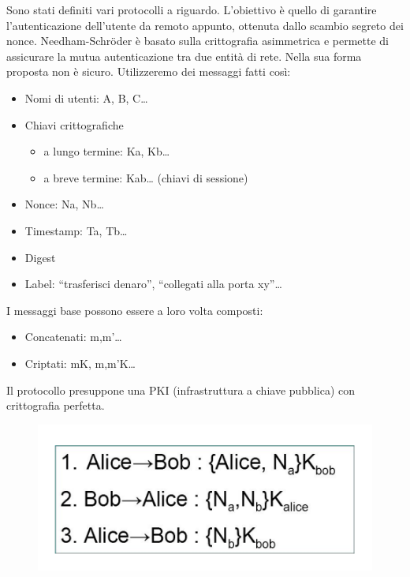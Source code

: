 Sono stati definiti vari protocolli a riguardo. L’obiettivo è quello di
garantire l’autenticazione
dell’utente da remoto appunto, ottenuta dallo scambio segreto dei nonce.
Needham-Schröder è basato sulla crittografia asimmetrica e permette
di assicurare la mutua
autenticazione tra due entità di rete. Nella sua forma proposta
non è sicuro.
Utilizzeremo dei messaggi fatti così:

\begin{itemize}
    \item Nomi di utenti: A, B, C…
    \item Chiavi crittografiche
          \begin{itemize}
              \item a lungo termine: Ka, Kb…
              \item a breve termine: Kab… (chiavi di sessione)
          \end{itemize}
    \item Nonce: Na, Nb…
    \item Timestamp: Ta, Tb…
    \item Digest
    \item Label: “trasferisci denaro”, “collegati alla porta xy”…
\end{itemize}

I messaggi base possono essere a loro volta composti:
\begin{itemize}
    \item Concatenati: m,m’…
    \item Criptati: mK, {m,m’}K…
\end{itemize}

Il protocollo presuppone una PKI (infrastruttura a chiave pubblica)
con crittografia perfetta.

\begin{figure}[H]
    \centering
    \includegraphics[width=\textwidth, keepaspectratio]{capitoli/crittografia/imgs/alieno.png}
\end{figure}

